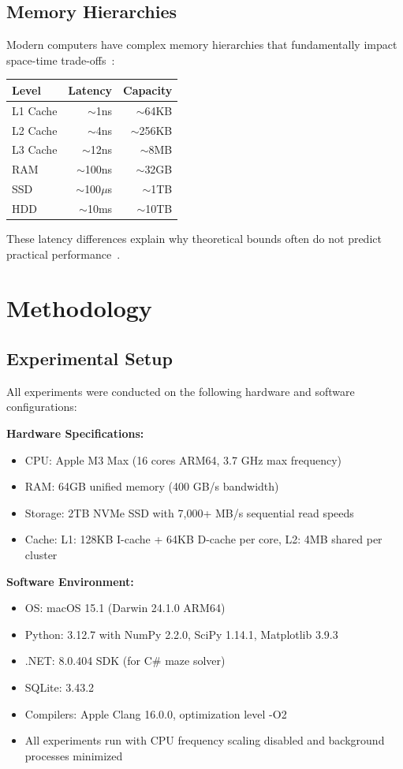 \documentclass[11pt]{article}
\theoremstyle{definition}
\begin{document}
\subsection{Memory Hierarchies}

Modern computers have complex memory hierarchies that fundamentally impact space-time trade-offs~\cite{vitter2008}:

\begin{center}
\begin{tabular}{lrr}
\toprule
Level & Latency & Capacity \\
\midrule
L1 Cache & $\sim$1ns & $\sim$64KB \\
L2 Cache & $\sim$4ns & $\sim$256KB \\
L3 Cache & $\sim$12ns & $\sim$8MB \\
RAM & $\sim$100ns & $\sim$32GB \\
SSD & $\sim$100$\mu$s & $\sim$1TB \\
HDD & $\sim$10ms & $\sim$10TB \\
\bottomrule
\end{tabular}
\end{center}

These latency differences explain why theoretical bounds often do not predict practical performance~\cite{patrascu2006}.

\section{Methodology}
\label{sec:methodology}

\subsection{Experimental Setup}

All experiments were conducted on the following hardware and software configurations:

\textbf{Hardware Specifications:}
\begin{itemize}
\item CPU: Apple M3 Max (16 cores ARM64, 3.7 GHz max frequency)
\item RAM: 64GB unified memory (400 GB/s bandwidth)
\item Storage: 2TB NVMe SSD with 7,000+ MB/s sequential read speeds
\item Cache: L1: 128KB I-cache + 64KB D-cache per core, L2: 4MB shared per cluster
\end{itemize}

\textbf{Software Environment:}
\begin{itemize}
\item OS: macOS 15.1 (Darwin 24.1.0 ARM64)
\item Python: 3.12.7 with NumPy 2.2.0, SciPy 1.14.1, Matplotlib 3.9.3
\item .NET: 8.0.404 SDK (for C\# maze solver)
\item SQLite: 3.43.2
\item Compilers: Apple Clang 16.0.0, optimization level -O2
\item All experiments run with CPU frequency scaling disabled and background processes minimized
\end{itemize}
\end{document}
